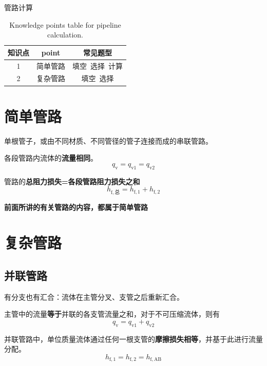\documentclass{book}
\DeclareRobustCommand{\bluebold}[1]{\textbf{\textcolor[rgb]{0.31,0.63,0.86}{#1}}}
\begin{document}
\tableofcontents
\clearpage

管路计算

\begin{table}[htbp]
\centering
\begin{tabular}{c c c} 
\toprule
知识点 & point & 常见题型\\ [0.5ex] 
\midrule
1 & 简单管路 & 填空~选择~计算\\
2 & 复杂管路 & 填空~选择\\
\bottomrule
\end{tabular}
\caption{Knowledge points table for pipeline calculation.}
\label{table:pipeline-knowledge}
\end{table}

\chapter{简单管路}

单根管子，或由不同材质、不同管径的管子连接而成的串联管路。

各段管路内流体的\bluebold{流量相同}。
\begin{equation}
q_\mathrm{v} = q_\mathrm{v1} = q_\mathrm{v2}
\label{eq:simple-pipe-flow}
\end{equation}

管路的\bluebold{总阻力损失=各段管路阻力损失之和}
\begin{equation}
h_\mathrm{f,\text{总}} = h_\mathrm{f,1} + h_\mathrm{f,2}
\label{eq:simple-pipe-hf}
\end{equation}

\bluebold{前面所讲的有关管路的内容，都属于简单管路}

\chapter{复杂管路}

\section{并联管路}

有分支也有汇合：流体在主管分叉、支管之后重新汇合。

主管中的流量\bluebold{等于}并联的各支管流量之和，对于不可压缩流体，则有
\begin{equation}
q_\mathrm{v} = q_\mathrm{v1} + q_\mathrm{v2}
\label{eq:parallel-pipe-flow}
\end{equation}

并联管路中，单位质量流体通过任何一根支管的\bluebold{摩擦损失相等}，并基于此进行流量分配。
\begin{equation}
h_\mathrm{f,1} = h_\mathrm{f,2} = h_\mathrm{f,AB}
\label{eq:parallel-pipe-hf}
\end{equation}
\end{document}
